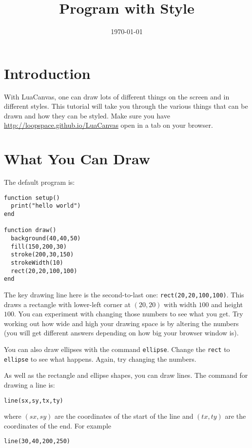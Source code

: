 \documentclass[
  xhtml,%
  use filename%
]{internet}
\title{Program with Style}
\date{\today}
\begin{document}
\maketitle

\section{Introduction}

With LuaCanvas, one can draw lots of different things on the screen and in different styles.
This tutorial will take you through the various things that can be drawn and how they can be styled.
Make sure you have \href{http://loopspace.github.io/LuaCanvas}{http://loopspace.github.io/LuaCanvas} open in a tab on your browser.

\section{What You Can Draw}

The default program is:

\begin{verbatim}
function setup()
  print("hello world")
end

function draw()
  background(40,40,50)
  fill(150,200,30)
  stroke(200,30,150)
  strokeWidth(10)
  rect(20,20,100,100)
end
\end{verbatim}

The key drawing line here is the second-to-last one: \verb+rect(20,20,100,100)+.
This draws a rectangle with lower-left corner at \((20,20)\) with width \(100\) and height \(100\).
You can experiment with changing those numbers to see what you get.
Try working out how wide and high your drawing space is by altering the numbers (you will get different answers depending on how big your browser window is).

You can also draw ellipses with the command \verb+ellipse+.
Change the \verb+rect+ to \verb+ellipse+ to see what happens.
Again, try changing the numbers.

As well as the rectangle and ellipse shapes, you can draw lines.
The command for drawing a line is:

\begin{verbatim}
line(sx,sy,tx,ty)
\end{verbatim}

where \((sx,sy)\) are the coordinates of the start of the line and \((tx,ty)\) are the coordinates of the end.
For example

\begin{verbatim}
line(30,40,200,250)
\end{verbatim}
\end{document}
